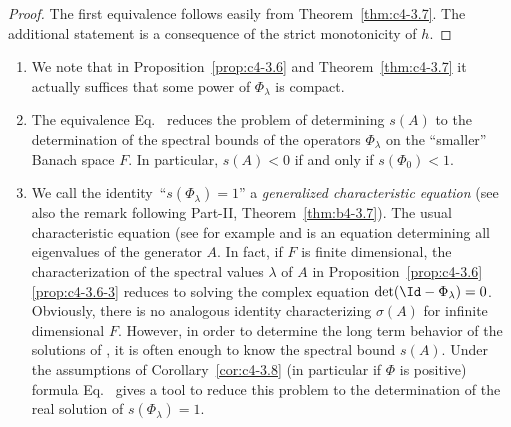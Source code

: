 \begin{proof}
The first equivalence follows easily from Theorem~\ref{thm:c4-3.7}. 
The additional statement is a consequence of the strict monotonicity of\/ $h$.
\end{proof}
\begin{remarks*}\label{rem:c4-3.0-kgk}
%
\begin{enumerate}[\upshape (i), wide, labelindent=.25em] 
\item \label{rem:c4-3.1-1}
We note that in Proposition~\ref{prop:c4-3.6} and Theorem~\ref{thm:c4-3.7} it actually suffices that some power of\/ $\Phi_{\lambda}$ is compact.

\item \label{rem:c4-3.1-2}
The equivalence Eq.~ reduces the problem of determining $s(A)$ to the determination of the spectral bounds of the operators $\Phi_{\lambda}$ on the \enquote{smaller} Banach space $F$.
In particular, $s(A) < 0$ if and only if\/ $s(\Phi_{0}) < 1$.

\item \label{rem:c4-3.1-3}
We call the identity\, \enquote{$s(\Phi_{\lambda}) = 1$} a \emph{generalized characteristic equation} (see also the remark following Part-II, Theorem~\ref{thm:b4-3.7}). The usual characteristic equation (see for example  \textcite[p.168ff]{hale:1977} and \textcite[Section~5]{heijmans:1985b}
is an equation determining all eigenvalues of the generator $A$. 
In fact, if\/ $F$ is finite dimensional, the characterization of the spectral values $\lambda$ of\/ $A$ in Proposition~\ref{prop:c4-3.6}\,\ref{prop:c4-3.6-3} reduces to solving the complex equation $\det(\Id - \Phi_{\lambda}) = 0$. 
Obviously, there is no analogous identity characterizing $\sigma(A)$ for infinite dimensional $F$. 
However, in order to determine the long term behavior of the solutions of , it is often enough to know the spectral bound $s(A)$. 
Under the assumptions of Corollary~\ref{cor:c4-3.8} (in particular if\/ $\Phi$ is positive) formula Eq.~ gives a tool to reduce this problem to the determination of the real solution of\/ $s(\Phi_{\lambda}) = 1$.
\end{enumerate}
\end{remarks*}
